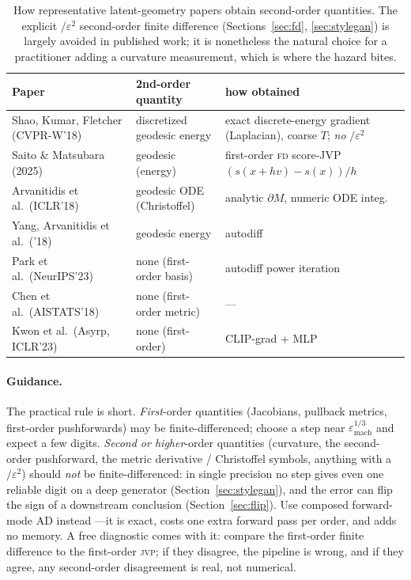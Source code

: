\documentclass[11pt]{article}
\newcommand{\jvp}{\textsc{jvp}}
\newcommand{\fd}{\textsc{fd}}
\newcommand{\eps}{\varepsilon}
\begin{document}
\begin{table}[h]\centering\small
\begin{tabular}{>{\raggedright}p{4.4cm} l p{3.6cm}}
\toprule
Paper & 2nd-order quantity & how obtained \\
\midrule
Shao, Kumar, Fletcher (CVPR-W'18) & discretized geodesic energy &
exact discrete-energy gradient (Laplacian), coarse $T$; \emph{no} $/\eps^2$ \\
Saito \& Matsubara (2025) & geodesic (energy) & first-order \fd{} score-JVP $(s(x{+}hv){-}s(x))/h$ \\
Arvanitidis et al.\ (ICLR'18) & geodesic ODE (Christoffel) & analytic $\partial M$, numeric ODE integ. \\
Yang, Arvanitidis et al.\ ('18) & geodesic energy & autodiff \\
Park et al.\ (NeurIPS'23) & none (first-order basis) & autodiff power iteration \\
Chen et al.\ (AISTATS'18) & none (first-order metric) & --- \\
Kwon et al.\ (Asyrp, ICLR'23) & none (first-order) & CLIP-grad + MLP \\
\bottomrule
\end{tabular}
\caption{How representative latent-geometry papers obtain second-order quantities.
The explicit $/\eps^2$ second-order finite difference (Sections~\ref{sec:fd},
\ref{sec:stylegan}) is largely avoided in published work; it is nonetheless the
natural choice for a practitioner adding a curvature measurement, which is where
the hazard bites.}
\label{tab:survey}
\end{table}

\paragraph{Guidance.} The practical rule is short. \emph{First}-order quantities
(Jacobians, pullback metrics, first-order pushforwards) may be finite-differenced;
choose a step near $\eps_{\mathrm{mach}}^{1/3}$ and expect a few digits. \emph{Second
or higher}-order quantities (curvature, the second-order pushforward, the metric
derivative / Christoffel symbols, anything with a $/\eps^2$) should \emph{not} be
finite-differenced: in single precision no step gives even one reliable digit on a
deep generator (Section~\ref{sec:stylegan}), and the error can flip the sign of a
downstream conclusion (Section~\ref{sec:flip}). Use composed forward-mode AD instead
---it is exact, costs one extra forward pass per order, and adds no memory. A free
diagnostic comes with it: compare the first-order finite difference to the
first-order \jvp; if they disagree, the pipeline is wrong, and if they agree, any
second-order disagreement is real, not numerical.
\end{document}
